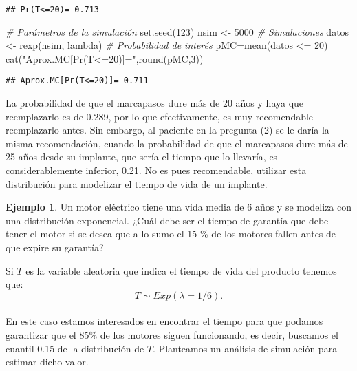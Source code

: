\documentclass[
]{book}
\newenvironment{Shaded}{\begin{snugshade}}{\end{snugshade}}
\newcommand{\CommentTok}[1]{\textcolor[rgb]{0.56,0.35,0.01}{\textit{#1}}}
\newcommand{\DecValTok}[1]{\textcolor[rgb]{0.00,0.00,0.81}{#1}}
\newcommand{\FunctionTok}[1]{\textcolor[rgb]{0.00,0.00,0.00}{#1}}
\newcommand{\NormalTok}[1]{#1}
\newcommand{\OtherTok}[1]{\textcolor[rgb]{0.56,0.35,0.01}{#1}}
\newcommand{\SpecialCharTok}[1]{\textcolor[rgb]{0.00,0.00,0.00}{#1}}
\newcommand{\StringTok}[1]{\textcolor[rgb]{0.31,0.60,0.02}{#1}}
\theoremstyle{definition}
\theoremstyle{definition}
\newtheorem{example}{Ejemplo}[chapter]
\theoremstyle{definition}
\theoremstyle{definition}
\theoremstyle{remark}
\begin{document}
\begin{verbatim}
## Pr(T<=20)= 0.713
\end{verbatim}

\begin{Shaded}
\begin{Highlighting}[]
\CommentTok{\# Parámetros de la simulación}
\FunctionTok{set.seed}\NormalTok{(}\DecValTok{123}\NormalTok{)}
\NormalTok{nsim }\OtherTok{\textless{}{-}} \DecValTok{5000}
\CommentTok{\# Simulaciones}
\NormalTok{datos }\OtherTok{\textless{}{-}} \FunctionTok{rexp}\NormalTok{(nsim, lambda)}
\CommentTok{\# Probabilidad de interés}
\NormalTok{pMC}\OtherTok{=}\FunctionTok{mean}\NormalTok{(datos }\SpecialCharTok{\textless{}=} \DecValTok{20}\NormalTok{)}
\FunctionTok{cat}\NormalTok{(}\StringTok{"Aprox.MC[Pr(T\textless{}=20)]="}\NormalTok{,}\FunctionTok{round}\NormalTok{(pMC,}\DecValTok{3}\NormalTok{))}
\end{Highlighting}
\end{Shaded}

\begin{verbatim}
## Aprox.MC[Pr(T<=20)]= 0.711
\end{verbatim}

La probabilidad de que el marcapasos dure más de 20 años y haya que reemplazarlo es de 0.289, por lo que efectivamente, es muy recomendable reemplazarlo antes. Sin embargo, al paciente en la pregunta (2) se le daría la misma recomendación, cuando la probabilidad de que el marcapasos dure más de 25 años desde su implante, que sería el tiempo que lo llevaría, es considerablemente inferior, 0.21. No es pues recomendable, utilizar esta distribución para modelizar el tiempo de vida de un implante.

\begin{example}
\protect\hypertarget{exm:exponencial02}{}\label{exm:exponencial02}Un motor eléctrico tiene una vida media de 6 años y se modeliza con una distribución exponencial. ¿Cuál debe ser el tiempo de garantía que debe tener el motor si se desea que a lo sumo el 15 \% de los motores fallen antes de que expire su garantía?
\end{example}

Si \(T\) es la variable aleatoria que indica el tiempo de vida del producto tenemos que: \[T \sim Exp(\lambda = 1/6).\]\\
En este caso estamos interesados en encontrar el tiempo para que podamos garantizar que el 85\% de los motores siguen funcionando, es decir, buscamos el cuantil 0.15 de la distribución de \(T\). Planteamos un análisis de simulación para estimar dicho valor.
\end{document}
